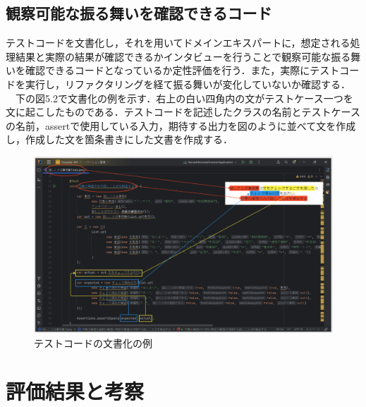 \documentclass[12pt, a4paper]{jreport}
\begin{document}
\subsection{観察可能な振る舞いを確認できるコード}
テストコードを文書化し，それを用いてドメインエキスパートに，想定される処理結果と実際の結果が確認できるかインタビューを行うことで観察可能な振る舞いを確認できるコードとなっているか定性評価を行う．また，実際にテストコードを実行し，リファクタリングを経て振る舞いが変化していないか確認する．
\\　下の図5.2で文書化の例を示す．右上の白い四角内の文がテストケース一つを文に起こしたものである．テストコードを記述したクラスの名前とテストケースの名前，assertで使用している入力，期待する出力を図のように並べて文を作成し，作成した文を箇条書きにした文書を作成する．
\begin{figure}[H]
\centering
\includegraphics[width=1\linewidth]{image/testDoc.png}
\caption{テストコードの文書化の例}
\label{fig:enter-label}
\end{figure}
\section{評価結果と考察}
\end{document}
